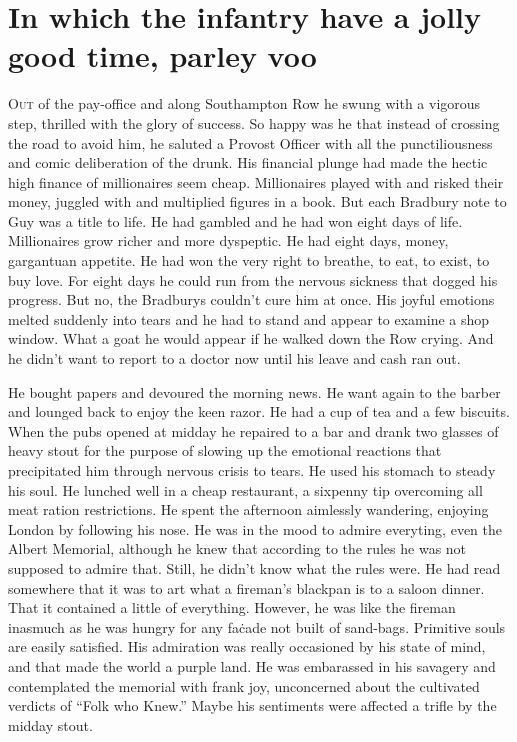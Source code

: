 \chapter*{\textsf{In which the infantry have a jolly good time, parley voo}}

O\textsc{ut} of the pay-office and along Southampton Row he swung with a vigorous step, thrilled with the glory of success. So happy was he that instead of crossing the road to avoid him, he saluted a Provost Officer with all the punctiliousness and comic deliberation of the drunk. His financial plunge had made the hectic high finance of millionaires seem cheap. Millionaires played with and risked their money, juggled with and multiplied figures in a book. But each Bradbury note to Guy was a title to life. He had gambled and he had won eight days of life. Millionaires grow richer and more dyspeptic. He had eight days, money, gargantuan appetite. He had won the very right to breathe, to eat, to exist, to buy love. For eight days he could run from the nervous sickness that dogged his progress. But no, the Bradburys couldn't cure him at once. His joyful emotions melted suddenly into tears and he had to stand and appear to examine a shop window. What a goat he would appear if he walked down the Row crying. And he didn't want to report to a doctor now until his leave and cash ran out.

He bought papers and devoured the morning news. He want again to the barber and lounged back to enjoy the keen razor. He had a cup of tea and a few biscuits. When the pubs opened at midday he repaired to a bar and drank two glasses of heavy stout for the purpose of slowing up the emotional reactions that precipitated him through nervous crisis to tears. He used his stomach to steady his soul. He lunched well in a cheap restaurant, a sixpenny tip overcoming all meat ration restrictions. He spent the afternoon aimlessly wandering, enjoying London by following his nose. He was in the mood to admire everyting, even the Albert Memorial, although he knew that according to the rules he was not supposed to admire that. Still, he didn't know what the rules were. He had read somewhere that it was to art what a fireman's blackpan is to a saloon dinner. That it contained a little of everything. However, he was like the fireman inasmuch as he was hungry for any fa\.{c}ade not built of sand-bags. Primitive souls are easily satisfied. His admiration was really occasioned by his state of mind, and that made the world a purple land. He was embarassed in his savagery and contemplated the memorial with frank joy, unconcerned about the cultivated verdicts of ``Folk who Knew.'' Maybe his sentiments were affected a trifle by the midday stout.

